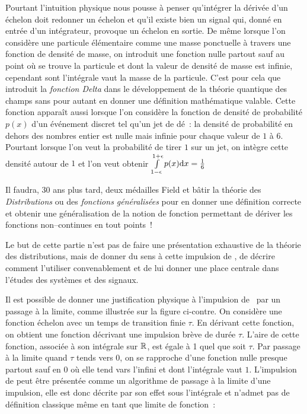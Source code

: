 \begin{remark}{}
        Pourtant l'intuition physique nous pousse à penser qu'intégrer
        la dérivée d'un échelon doit redonner un échelon et qu'il
        existe bien un signal qui, donné en entrée d'un intégrateur,
        provoque un échelon en sortie. De même lorsque l'on considère
        une particule élémentaire comme une masse ponctuelle à travers
        une fonction de densité de masse, on introduit une fonction
        nulle partout sauf au point où se trouve la particule et dont
        la valeur de densité de masse est infinie, cependant sont
        l'intégrale vaut la masse de la particule. C'est pour cela que
        \Dirac{} introduit la \emph{fonction Delta} dans le
        développement de la théorie quantique des champs sans pour
        autant en donner une définition mathématique valable. Cette
        fonction apparaît aussi lorsque l'on considère la fonction de
        densité de probabilité $p(x)$ d'un événement discret tel qu'un
        jet de dé~: la densité de probabilité en dehors des nombres
        entier est nulle mais infinie pour chaque valeur de $1$ à
        $6$. Pourtant lorsque l'on veut la probabilité de tirer $1$
        sur un jet, on intègre cette densité autour de $1$ et l'on veut
        obtenir
        $\int\limits_{1-\epsilon}^{1+\epsilon}p(x) \mathrm{d{}} x=\frac{1}{6}$

        Il
        faudra, 30 ans plus tard, deux médailles Field et bâtir la
        théorie des \emph{Distributions} ou des \emph{fonctions
          généralisées} pour en donner une définition correcte et
        obtenir une généralisation de la notion de fonction permettant
        de dériver les fonctions non--continues en tout points~!

        Le but de cette partie n'est pas de faire une présentation
        exhaustive de la théorie des distributions, mais de donner du
        sens à cette impulsion de \Dirac, de décrire comment
        l'utiliser convenablement et de lui donner une place centrale
        dans l'études des systèmes et des signaux.

        Il est possible de donner une justification physique à
        l'impulsion de \Dirac{} par un passage à la limite, comme
        illustrée sur la figure ci-contre. On considère une fonction
        échelon avec un temps de transition finie $\tau$. En dérivant
        cette fonction, on obtient une fonction décrivant une
        impulsion brève de durée $\tau$. L'aire de cette fonction,
        associée à son intégrale sur $\mathbb{R}$, est égale à 1 quel que soit
        $\tau$. Par passage à la limite quand $\tau$ tends vers 0, on
        se rapproche d'une fonction nulle presque partout sauf en $0$
        où elle tend vars l'infini et dont l'intégrale vaut
        $1$. L'impulsion de \Dirac{} peut être présentée comme un
        algorithme de passage à la limite d'une impulsion, elle est
        donc décrite par \og{} son effet sous l'intégrale \fg{} et
        n'admet pas de définition classique même en tant que limite de
        fonction~:
	

\end{remark}
